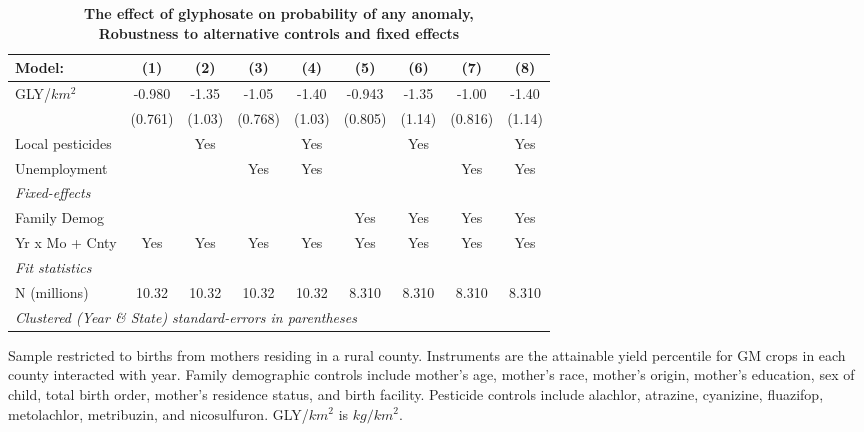 \begin{table}[htbp]
   \centering
   \small
   \begin{threeparttable}[b]
      \caption{\label{tab:robust-cntrl-any_anomaly-allyielddiffpercentilegmo} \textbf{The effect of glyphosate on probability of any anomaly, \\ Robustness to alternative controls and fixed effects}}
      \begin{tabular}{lcccccccc}
         \toprule
         Model:           & (1)     & (2)    & (3)     & (4)    & (5)     & (6)    & (7)     & (8)\\  
         \midrule 
         GLY/$km^2$       & -0.980  & -1.35  & -1.05   & -1.40  & -0.943  & -1.35  & -1.00   & -1.40\\   
                          & (0.761) & (1.03) & (0.768) & (1.03) & (0.805) & (1.14) & (0.816) & (1.14)\\   
         Local pesticides &         & Yes    &         & Yes    &         & Yes    &         & Yes\\  
         Unemployment     &         &        & Yes     & Yes    &         &        & Yes     & Yes\\  
         \midrule
         \emph{Fixed-effects}\\
         Family Demog     &         &        &         &        & Yes     & Yes    & Yes     & Yes\\  
         Yr x Mo + Cnty   & Yes     & Yes    & Yes     & Yes    & Yes     & Yes    & Yes     & Yes\\  
         \midrule
         \emph{Fit statistics}\\
         N (millions)     & 10.32   & 10.32  & 10.32   & 10.32  & 8.310   & 8.310  & 8.310   & 8.310\\  
         \midrule
         \multicolumn{9}{l}{\emph{Clustered (Year \& State) standard-errors in parentheses}}\\
      \end{tabular}
      
      \begin{tablenotes}\item Sample restricted to births from mothers residing in a rural county. Instruments are the attainable yield percentile for GM crops in each county interacted with year. Family demographic controls include mother's age, mother's race, mother's origin, mother's education, sex of child, total birth order, mother's residence status, and birth facility. Pesticide controls include alachlor, atrazine, cyanizine, fluazifop, metolachlor, metribuzin, and nicosulfuron. GLY/$km^2$ is $kg/km^2$.
      \end{tablenotes}
   \end{threeparttable}
\end{table}
